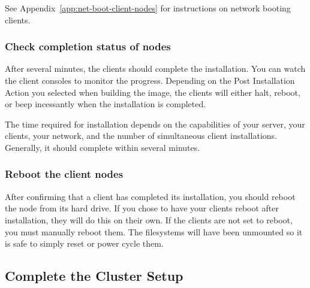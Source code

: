 See Appendix~\ref{app:net-boot-client-nodes} for instructions on
network booting clients.


\subsubsection{Check completion status of nodes}
\label{det:client-finish}

After several minutes, the clients should complete the installation.
You can watch the client consoles to monitor the progress. Depending
on the Post Installation Action you selected when building the image,
the clients will either halt, reboot, or beep incessantly when the
installation is completed.

The time required for installation depends on the capabilities of your
server, your clients, your network, and the number of simultaneous
client installations.  Generally, it should complete within several
minutes.
  

\subsubsection{Reboot the client nodes}

After confirming that a client has completed its installation, you
should reboot the node from its hard drive. If you chose to have your
clients reboot after installation, they will do this on their
own. If the clients are not set to reboot, you must manually
reboot them. The filesystems will have been unmounted so it is safe
to simply reset or power cycle them.



\subsection{Complete the Cluster Setup}
\label{det:complete-cluster-setup}

